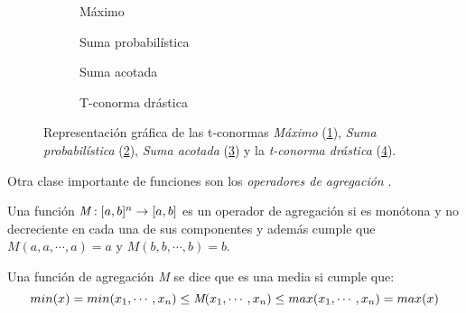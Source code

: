 \begin{figure}[H]
	\centering
	\begin{subfigure}[b]{0.45\textwidth}
		\setlength\figureheight{4.5cm}
		\setlength\figurewidth{6cm}
		
		\caption{Máximo}
		\label{fig:t-conorms-max}
	\end{subfigure}
	\qquad
	\begin{subfigure}[b]{0.45\textwidth}
		\setlength\figureheight{4.5cm}
		\setlength\figurewidth{6cm}
		
		\caption{Suma probabilística}
		\label{fig:t-conorms-probabilistic-sum}
	\end{subfigure}
	
	\vspace{1 cm}
	\begin{subfigure}[b]{0.45\textwidth}
		\setlength\figureheight{4.5cm}
		\setlength\figurewidth{6cm}
		
		\caption{Suma acotada}
		\label{fig:t-conorms-bounded-sum}
	\end{subfigure}
	\qquad
	\begin{subfigure}[b]{0.45\textwidth}
			\setlength\figureheight{4.5cm}
			\setlength\figurewidth{6cm}
			
			\caption{T-conorma drástica}
			\label{fig:t-conorms-drastic}
	\end{subfigure}
	\label{fig:t-conorms}
	\caption{Representación gráfica de las t-conormas \emph{Máximo} (\ref{fig:t-conorms-max}), \emph{Suma probabilística} (\ref{fig:t-conorms-probabilistic-sum}), \emph{Suma acotada} (\ref{fig:t-conorms-bounded-sum})  y la \emph{t-conorma drástica} (\ref{fig:t-conorms-drastic}).}
\end{figure}
Otra clase importante de funciones son los \emph{operadores de agregación} \cite{calvo2002aggregation, beliakov2007aggregation}.
\begin{definition}
Una función $\emph{M} : [a,b]^{n} \rightarrow [a,b]$ es un operador de agregación si es monótona y no decreciente en cada una de sus componentes y además cumple que $M(a, a, \cdots,a) = a$ y $M(b, b, \cdots,b) = b$.
\end{definition}
\begin{definition}
Una función de agregación \emph{M} se dice que es una media si cumple que:
\begin{equation}\label{def:mean-aggregation-operator}
min(x) = min(x_{1},\cdots,x_{n})\leq \emph{M}(x_{1},\cdots,x_{n}) \leq max(x_{1},\cdots,x_{n}) = max(x)
\end{equation}
\end{definition}
